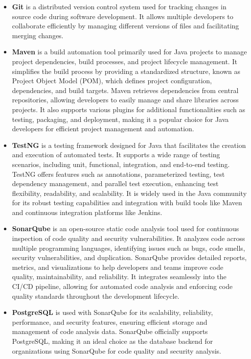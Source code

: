 \documentclass[12pt,a4paper,oneside]{report}
\begin{document}
\begin{itemize}
  


\item \textbf{Git} is a distributed version control system used for tracking changes in source code during software development. It allows multiple developers to collaborate efficiently by managing different versions of files and facilitating merging changes.

\item \textbf{Maven} is a build automation tool primarily used for Java projects to manage project dependencies, build processes, and project lifecycle management. It simplifies the build process by providing a standardized structure, known as Project Object Model (POM), which defines project configuration, dependencies, and build targets. Maven retrieves dependencies from central repositories, allowing developers to easily manage and share libraries across projects. It also supports various plugins for additional functionalities such as testing, packaging, and deployment, making it a popular choice for Java developers for efficient project management and automation.

\item \textbf{TestNG} is a testing framework designed for Java that facilitates the creation and execution of automated tests. It supports a wide range of testing scenarios, including unit, functional, integration, and end-to-end testing. TestNG offers features such as annotations, parameterized testing, test dependency management, and parallel test execution, enhancing test flexibility, readability, and scalability. It is widely used in the Java community for its robust testing capabilities and integration with build tools like Maven and continuous integration platforms like Jenkins.

\item \textbf{SonarQube} is an open-source static code analysis tool used for continuous inspection of code quality and security vulnerabilities. It analyzes code across multiple programming languages, identifying issues such as bugs, code smells, security vulnerabilities, and duplication. SonarQube provides detailed reports, metrics, and visualizations to help developers and teams improve code quality, maintainability, and reliability. It integrates seamlessly into the CI/CD pipeline, allowing for automated code analysis and enforcing code quality standards throughout the development lifecycle.

\item \textbf{PostgreSQL} is used with SonarQube for its scalability, reliability, performance, and security features, ensuring efficient storage and management of code analysis data. SonarQube officially supports PostgreSQL, making it an ideal choice as the database backend for organizations using SonarQube for code quality and security analysis.


\end{itemize}
\end{document}
